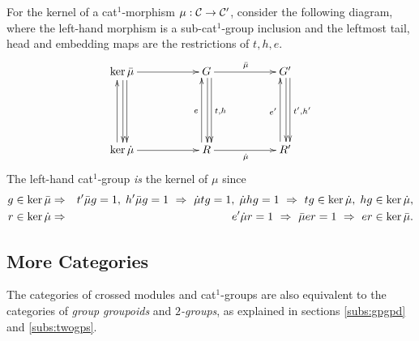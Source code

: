 For the kernel of a cat$^1$-morphism $\mu : \mathcal{C} \to \mathcal{C}'$, 
consider the following diagram, where the left-hand morphism is a 
sub-cat$^1$-group inclusion and the leftmost tail, head and embedding maps 
are the restrictions of $t,h,e$. 
\begin{equation*} \label{eq:cat1kernel}
\vcenter{\xymatrix{
   \ker\barm \ar[rr] \ar[dd]<1.0ex> \ar[dd]<0.2ex> 
     && G \ar[dd]<1.0ex>^{t,h} \ar[dd]<0.2ex> \ar[rr]^{\barm}
          && G' \ar[dd]<1.0ex>^{t',h'} \ar[dd]<0.2ex>  \\
     &&  \\
   \ker\dm \ar[rr] \ar[uu]<1.0ex> 
     && R \ar[uu]<1.0ex>^{e} \ar[rr]_{\dm}
          && R' \ar[uu]<1.0ex>^{e'} 
}}
\end{equation*}
The left-hand cat$^1$-group \emph{is} the kernel of $\mu$ since 
\begin{eqnarray*}
g \in \ker\bar{\mu} 
  & \Rightarrow 
    & t'\bar{\mu} g = 1,\; h'\bar{\mu} g = 1 ~\Rightarrow~ 
      \dot{\mu} tg = 1,\; \dot{\mu} hg = 1 ~\Rightarrow~ 
      tg \in \ker\dot{\mu},\; hg \in \ker\dot{\mu}, \\
r \in \ker\dot{\mu} 
  & \Rightarrow 
    & e'\dot{\mu} r = 1 ~\Rightarrow~ 
      \bar{\mu} er = 1 ~\Rightarrow~ 
      er \in \ker\bar{\mu}. 
\end{eqnarray*}

\subsection{More Categories} \label{subs:more-cat} 

The categories of crossed modules and cat$^1$-groups are also equivalent 
to the categories of \emph{group groupoids} and \emph{$2$-groups}, 
as explained in sections \ref{subs:gpgpd} and \ref{subs:twogps}. 
